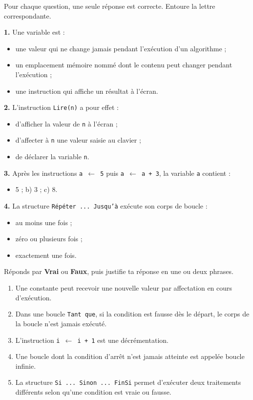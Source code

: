 \documentclass[11pt]{article}
\newcommand{\cle}[1]{{\popxbold\color{popdark}#1}}
\begin{document}
\begin{exercice}
Pour chaque question, une seule réponse est correcte. Entoure la lettre correspondante.

\textbf{1.} Une \cle{variable} est :
\begin{itemize}
  \item[a)] une valeur qui ne change jamais pendant l'exécution d'un algorithme ;
  \item[b)] un emplacement mémoire nommé dont le contenu peut changer pendant l'exécution ;
  \item[c)] une instruction qui affiche un résultat à l'écran.
\end{itemize}

\textbf{2.} L'instruction \texttt{Lire(n)} a pour effet :
\begin{itemize}
  \item[a)] d'afficher la valeur de \texttt{n} à l'écran ;
  \item[b)] d'affecter à \texttt{n} une valeur saisie au clavier ;
  \item[c)] de déclarer la variable \texttt{n}.
\end{itemize}

\textbf{3.} Après les instructions \texttt{a $\leftarrow$ 5} puis \texttt{a $\leftarrow$ a + 3}, la variable \texttt{a} contient :
\begin{itemize}
  \item[a)] 5 ; \qquad b) 3 ; \qquad c) 8.
\end{itemize}

\textbf{4.} La structure \texttt{Répéter ... Jusqu'à} exécute son corps de boucle :
\begin{itemize}
  \item[a)] au moins une fois ;
  \item[b)] zéro ou plusieurs fois ;
  \item[c)] exactement une fois.
\end{itemize}
\end{exercice}

\begin{exercice}
Réponds par \textbf{Vrai} ou \textbf{Faux}, puis justifie ta réponse en une ou deux phrases.
\begin{enumerate}
  \item Une constante peut recevoir une nouvelle valeur par affectation en cours d'exécution.
  \item Dans une boucle \texttt{Tant que}, si la condition est fausse dès le départ, le corps de la boucle n'est jamais exécuté.
  \item L'instruction \texttt{i $\leftarrow$ i + 1} est une décrémentation.
  \item Une boucle dont la condition d'arrêt n'est jamais atteinte est appelée boucle infinie.
  \item La structure \texttt{Si ... Sinon ... FinSi} permet d'exécuter deux traitements différents selon qu'une condition est vraie ou fausse.
\end{enumerate}
\end{exercice}
\end{document}
